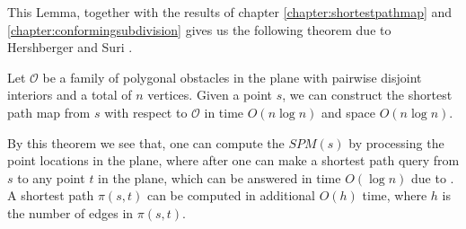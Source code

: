 This Lemma, together with the results of chapter \ref{chapter:shortestpathmap} and \ref{chapter:conformingsubdivision} gives us the 
following theorem due to Hershberger and Suri \cite{HershbergerS99}.

\begin{theorem}
Let $\mathcal{O}$ be a family of polygonal obstacles in the plane with pairwise disjoint interiors and a total of $n$ vertices. Given a
point $s$, we can construct the shortest path map from $s$ with respect to $\mathcal{O}$ in time $O(n \log n)$ and space $O(n \log n)$.
\end{theorem}

By this theorem we see that, one can compute the $SPM(s)$ by processing the point locations in the plane, where after 
one can make a shortest path query from $s$ to any point $t$ in the plane, which can be answered in time $O(\log n)$ 
due to \cite{DBLP:journals/siamcomp/Kirkpatrick83}. A shortest path $\pi(s,t)$ can be computed in additional $O(h)$ 
time, where $h$ is the number of edges in $\pi(s,t)$.


